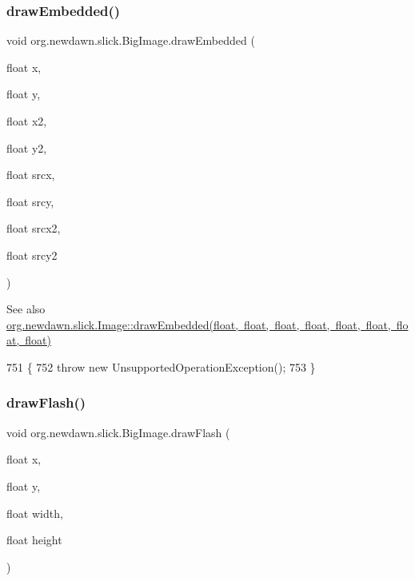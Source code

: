 \subsubsection{\texorpdfstring{draw\+Embedded()}{drawEmbedded()}\hspace{0.1cm}{\footnotesize\ttfamily [3/3]}}
{\footnotesize\ttfamily void org.\+newdawn.\+slick.\+Big\+Image.\+draw\+Embedded (\begin{DoxyParamCaption}\item[{float}]{x,  }\item[{float}]{y,  }\item[{float}]{x2,  }\item[{float}]{y2,  }\item[{float}]{srcx,  }\item[{float}]{srcy,  }\item[{float}]{srcx2,  }\item[{float}]{srcy2 }\end{DoxyParamCaption})\hspace{0.3cm}{\ttfamily [inline]}}

\begin{DoxySeeAlso}{See also}
\mbox{\hyperlink{classorg_1_1newdawn_1_1slick_1_1_image_a7a401738f513cacb04ae9ef28c9ef856}{org.\+newdawn.\+slick.\+Image\+::draw\+Embedded(float, float, float, float, float, float, float, float)}} 
\end{DoxySeeAlso}

\begin{DoxyCode}
751                                                   \{
752         \textcolor{keywordflow}{throw} \textcolor{keyword}{new} UnsupportedOperationException();
753     \}
\end{DoxyCode}
\mbox{\label{classorg_1_1newdawn_1_1slick_1_1_big_image_ae1a900a9ad455200db7d54ddc10d62fb}} 
\subsubsection{\texorpdfstring{draw\+Flash()}{drawFlash()}\hspace{0.1cm}{\footnotesize\ttfamily [1/3]}}
{\footnotesize\ttfamily void org.\+newdawn.\+slick.\+Big\+Image.\+draw\+Flash (\begin{DoxyParamCaption}\item[{float}]{x,  }\item[{float}]{y,  }\item[{float}]{width,  }\item[{float}]{height }\end{DoxyParamCaption})\hspace{0.3cm}{\ttfamily [inline]}}

